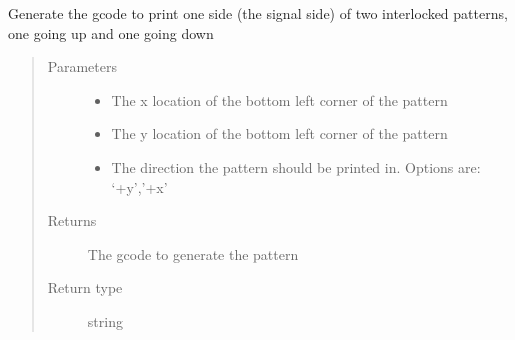 \documentclass[letterpaper,10pt,english]{sphinxmanual}
\begin{document}
\begin{fulllineitems}
\begin{fulllineitems}
\end{fulllineitems}


\begin{fulllineitems}
\label{\detokenize{index:calibration_pattern.calibration_pattern.differential_interlocked_signal_pattern}}
\sphinxAtStartPar
Generate the gcode to print one side (the signal side) of two interlocked patterns, one going up and one going down
\begin{quote}\begin{description}
\item[{Parameters}] \leavevmode\begin{itemize}
\item {} 
\sphinxAtStartPar
{} \textendash{} The x location of the bottom left corner of the pattern

\item {} 
\sphinxAtStartPar
{} \textendash{} The y location of the bottom left corner of the pattern

\item {} 
\sphinxAtStartPar
{} \textendash{} The direction the pattern should be printed in. Options are: ‘+y’,’+x’

\end{itemize}

\item[{Returns}] \leavevmode
\sphinxAtStartPar
The gcode to generate the pattern

\item[{Return type}] \leavevmode
\sphinxAtStartPar
string

\end{description}\end{quote}

\end{fulllineitems}



\end{fulllineitems}
\end{document}
